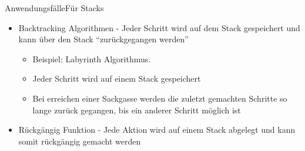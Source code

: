 \begin{frame}{Anwendungsfälle}{Für Stacks}
	\begin{itemize}
		\item Backtracking Algorithmen - Jeder Schritt wird auf dem Stack gespeichert und kann über den Stack "`zurückgegangen werden"'
		\begin{itemize}
			\item Beispiel: Labyrinth Algorithmus.
			\item Jeder Schritt wird auf einem Stack gespeichert
			\item Bei erreichen einer Sackgasse werden die zuletzt gemachten Schritte so lange zurück gegangen, bis ein anderer Schritt möglich ist
		\end{itemize}
		\item Rückgängig Funktion - Jede Aktion wird auf einem Stack abgelegt und kann somit rückgängig gemacht werden
	\end{itemize}
\end{frame}